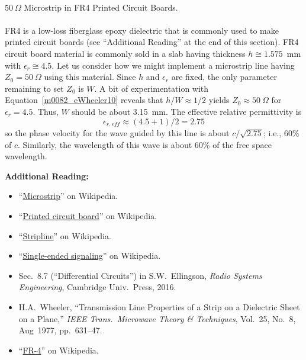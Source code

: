 ~\\ \begin{example} 
\begin{mdframed}[backgroundcolor=brown!20,linecolor=brown!20]\raggedright
$50~\Omega$ Microstrip in FR4 
Printed Circuit Boards.
\\~\\
FR4 is a low-loss fiberglass epoxy dielectric that is commonly used to make printed circuit boards (see ``Additional Reading'' at the end of this section).
FR4 circuit board material is commonly sold in a slab having thickness $h\cong 1.575$~mm 
with $\epsilon_r\cong 4.5$.  
Let us consider how we might implement a microstrip line having $Z_0=50~\Omega$ using this material.
Since $h$ and $\epsilon_r$ are fixed, the only parameter remaining to set $Z_0$ is $W$.
A bit of experimentation with Equation~\ref{m0082_eWheeler10} reveals that $h/W\approx 1/2$ yields $Z_0\approx 50~\Omega$ for $\epsilon_r=4.5$.  
Thus, $W$ should be about 3.15~mm.
The effective relative permittivity is 
%
\begin{equation}
\epsilon_{r,eff}\approx(4.5+1)/2 = 2.75
\nonumber
\end{equation}
%
so the phase velocity for the wave guided by this line is about $c/\sqrt{2.75}$; i.e., 60\% of $c$.
Similarly, the wavelength of this wave is about 60\% of the free space wavelength.
\end{mdframed}\end{example}


{\bf Additional Reading:}
\begin{itemize}
\item ``\href{https://en.wikipedia.org/wiki/Microstrip}{Microstrip}'' on Wikipedia.
\item ``\href{https://en.wikipedia.org/wiki/Printed_circuit_board}{Printed circuit board}'' on Wikipedia.
\item ``\href{https://en.wikipedia.org/wiki/Stripline}{Stripline}'' on Wikipedia.
\item ``\href{https://en.wikipedia.org/wiki/Single-ended_signaling}{Single-ended signaling}'' on Wikipedia.
\item Sec.~8.7 (``Differential Circuits'') in S.W.~Ellingson, \emph{Radio Systems Engineering}, Cambridge Univ.\ Press, 2016. 
\item H.A.\ Wheeler, ``Transmission Line Properties of a Strip on a Dielectric Sheet on a Plane,'' {\it IEEE Trans.\ Microwave Theory \& Techniques}, Vol.~25, No.~8, Aug~1977, pp.~631--47. %
\item ``\href{https://en.wikipedia.org/wiki/FR-4}{FR-4}'' on Wikipedia.
\end{itemize}
 

